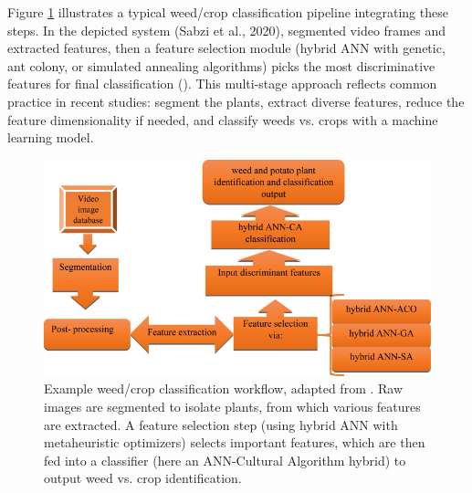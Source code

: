 \documentclass[letterpaper]{report}
\begin{document}
Figure \ref{fig:workflow-sabzi} illustrates a typical weed/crop classification pipeline integrating these steps. In the depicted system (Sabzi et al., 2020), segmented video frames  and extracted features, then a feature selection module (hybrid ANN with genetic, ant colony, or simulated annealing algorithms) picks the most discriminative features for final classification (\cite{Sabzi2020-af}). This multi-stage approach reflects common practice in recent studies: segment the plants, extract diverse features, reduce the feature dimensionality if needed, and classify weeds vs. crops with a machine learning model.

\begin{figure}[h!]
	\centering
	\includegraphics[width=0.5\linewidth]{./figures/workflow-sabzi.png}
	\caption[Color correction target and image set identification]{Example weed/crop classification workflow, adapted from \cite{Sabzi2020-af}. Raw images are segmented to isolate plants, from which various features are extracted. A feature selection step (using hybrid ANN with metaheuristic optimizers) selects important features, which are then fed into a classifier (here an ANN-Cultural Algorithm hybrid) to output weed vs. crop identification.}
	\label{fig:workflow-sabzi}
\end{figure}

%
\end{document}
